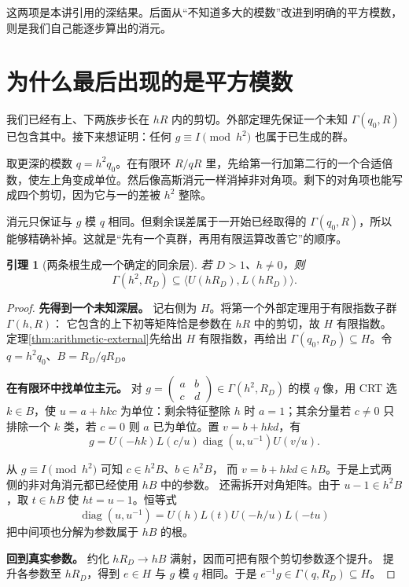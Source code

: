 \documentclass[11pt,a4paper,oneside,openany]{book}
\newcommand{\diag}{\operatorname{diag}}
\newtheorem{lemma}[theorem]{引理}
\theoremstyle{definition}
\numberwithin{equation}{chapter}
\begin{document}
这两项是本讲引用的深结果。后面从“不知道多大的模数”改进到明确的平方模数，则是我们自己能逐步算出的消元。

\section{为什么最后出现的是平方模数}
我们已经有上、下两族步长在 $hR$ 内的剪切。外部定理先保证一个未知 $\Gamma(q_0,R)$ 已包含其中。接下来想证明：任何 $g\equiv I\pmod{h^2}$ 也属于已生成的群。

取更深的模数 $q=h^2q_0$。在有限环 $R/qR$ 里，先给第一行加第二行的一个合适倍数，使左上角变成单位。然后像高斯消元一样消掉非对角项。剩下的对角项也能写成四个剪切，因为它与一的差被 $h^2$ 整除。

消元只保证与 $g$ 模 $q$ 相同。但剩余误差属于一开始已经取得的 $\Gamma(q_0,R)$，所以能够精确补掉。这就是“先有一个真群，再用有限运算改善它”的顺序。
\begin{lemma}[两条根生成一个确定的同余层]\label{lem:deep}
若 $D>1$、$h\ne0$，则
\[
\Gamma(h^2,R_D)\subseteq\langle U(hR_D),L(hR_D)\rangle.
\]
\end{lemma}
\begin{proof}

\par\noindent\textbf{先得到一个未知深层。}
记右侧为 $H$。将第一个外部定理用于有限指数子群 $\Gamma(h,R)$：
它包含的上下初等矩阵恰是参数在 $hR$ 中的剪切，故 $H$ 有限指数。
定理\ref{thm:arithmetic-external}先给出 $H$ 有限指数，再给出 $\Gamma(q_0,R_D)\subseteq H$。令 $q=h^2q_0$、$B=R_D/qR_D$。

\par\noindent\textbf{在有限环中找单位主元。}
对 $g=\left(\begin{smallmatrix}a&b\\c&d\end{smallmatrix}\right)\in\Gamma(h^2,R_D)$ 的模 $q$ 像，用 CRT 选 $k\in B$，使 $u=a+hkc$ 为单位：剩余特征整除 $h$ 时 $a=1$；其余分量若 $c\ne0$ 只排除一个 $k$ 类，若 $c=0$ 则 $a$ 已为单位。置 $v=b+hkd$，有
\[
g=U(-hk)L(c/u)\diag(u,u^{-1})U(v/u).
\]

从 $g\equiv I\pmod{h^2}$ 可知 $c\in h^2B$、$b\in h^2B$，
而 $v=b+hkd\in hB$。于是上式两侧的非对角消元都已经使用 $hB$ 中的参数。
还需拆开对角矩阵。由于 $u-1\in h^2B$，取 $t\in hB$ 使 $ht=u-1$。恒等式
\[
\diag(u,u^{-1})=U(h)L(t)U(-h/u)L(-tu)
\]
把中间项也分解为参数属于 $hB$ 的根。
\par\noindent\textbf{回到真实参数。}
约化 $hR_D\to hB$ 满射，因而可把有限个剪切参数逐个提升。
提升各参数至 $hR_D$，得到 $e\in H$ 与 $g$ 模 $q$ 相同。于是 $e^{-1}g\in\Gamma(q,R_D)\subseteq H$。
\end{proof}
\end{document}
